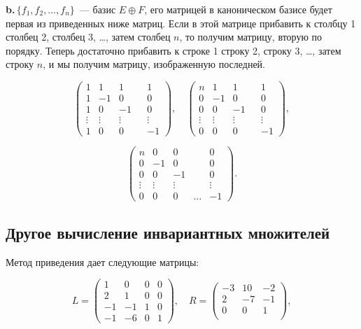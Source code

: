     {\bfseries b.\;}\,$\{f_1, f_2, \ldots, f_n\}$~— базис $E \oplus F$, его матрицей в каноническом базисе будет первая из приведенных ниже матриц. Если в этой матрице прибавить к столбцу 1 столбец 2, столбец 3, \ldots, затем столбец $n$, то получим матрицу, вторую по порядку. Теперь достаточно прибавить к строке 1 строку 2, строку 3, \ldots, затем строку $n$, и мы получим матрицу, изображенную последней.

    \[ \begin{pmatrix}
    1 & 1 & 1 && 1\\
    1 & -1 & 0 && 0\\
    1 & 0 & -1 && 0\\
    \vdots & \vdots & \vdots && \vdots\\
    1 & 0 & 0 && -1
    \end{pmatrix},\quad
    \begin{pmatrix}
    n & 1 & 1 && 1\\
    0 & -1 & 0 && 0\\
    0 & 0 & -1 && 0\\
    \vdots & \vdots & \vdots && \vdots\\
    0 & 0 & 0 && -1
    \end{pmatrix},
    \]

    \[ \begin{pmatrix}
    n & 0 & 0 && 0\\
    0 & -1 & 0 && 0\\
    0 & 0 & -1 && 0\\
    \vdots & \vdots & \vdots && \vdots\\
    0 & 0 & 0 & \dots & -1
    \end{pmatrix}
    .\]

    \newpage

    \subsection{\normalsize{Другое вычисление инвариантных множителей}}

    Метод приведения дает следующие матрицы:

    \[ L = \begin{pmatrix}
    1 & 0 & 0 & 0\\
    2 & 1 & 0 & 0\\
    -1 & -1 & 1 & 0\\
    -1 & -6 & 0 & 1
    \end{pmatrix},\quad
    R = \begin{pmatrix}
    -3 & 10 & -2\\
    2 & -7 & -1\\
    0 & 0 & 1\\
    \end{pmatrix},
    \]

